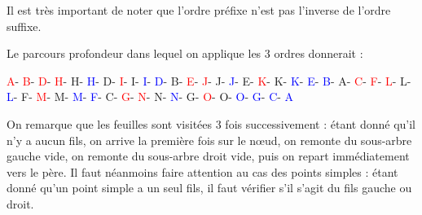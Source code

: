 \documentclass[11pt,a4paper]{article}
\begin{document}
\medskip

Il est très important de noter que l'ordre préfixe n'est pas l'inverse de l'ordre suffixe.

\medskip

Le parcours profondeur dans lequel on applique les 3 ordres donnerait :

\begin{center}
\textcolor{red}{A}-
\textcolor{red}{B}-
\textcolor{red}{D}-
\textcolor{red}{H}-
\textcolor{green(htmlcssgreen)}{H}-
\textcolor{blue}{H}-
\textcolor{green(htmlcssgreen)}{D}-
\textcolor{red}{I}-
\textcolor{green(htmlcssgreen)}{I}-
\textcolor{blue}{I}-
\textcolor{blue}{D}-
\textcolor{green(htmlcssgreen)}{B}-
\textcolor{red}{E}-
\textcolor{red}{J}-
\textcolor{green(htmlcssgreen)}{J}-
\textcolor{blue}{J}-
\textcolor{green(htmlcssgreen)}{E}-
\textcolor{red}{K}-
\textcolor{green(htmlcssgreen)}{K}-
\textcolor{blue}{K}-
\textcolor{blue}{E}-
\textcolor{blue}{B}-
\textcolor{green(htmlcssgreen)}{A}-%
\textcolor{red}{C}-
\textcolor{red}{F}-
\textcolor{red}{L}-
\textcolor{green(htmlcssgreen)}{L}-
\textcolor{blue}{L}-
\textcolor{green(htmlcssgreen)}{F}-
\textcolor{red}{M}-
\textcolor{green(htmlcssgreen)}{M}-
\textcolor{blue}{M}-
\textcolor{blue}{F}-
\textcolor{green(htmlcssgreen)}{C}-
\textcolor{red}{G}-
\textcolor{red}{N}-
\textcolor{green(htmlcssgreen)}{N}-
\textcolor{blue}{N}-
\textcolor{green(htmlcssgreen)}{G}-
\textcolor{red}{O}-
\textcolor{green(htmlcssgreen)}{O}-
\textcolor{blue}{O}-
\textcolor{blue}{G}-
\textcolor{blue}{C}-
\textcolor{blue}{A}
\end{center}

\medskip

On remarque que les feuilles sont visitées 3 fois successivement : étant donné qu'il n'y a aucun fils, on arrive la première fois sur le nœud, on remonte du sous-arbre gauche vide, on remonte du sous-arbre droit vide, puis on repart immédiatement vers le père.
Il faut néanmoins faire attention au cas des points simples : étant donné qu'un point simple a un seul fils, il faut vérifier s'il s'agit du fils gauche ou droit.
\end{document}
